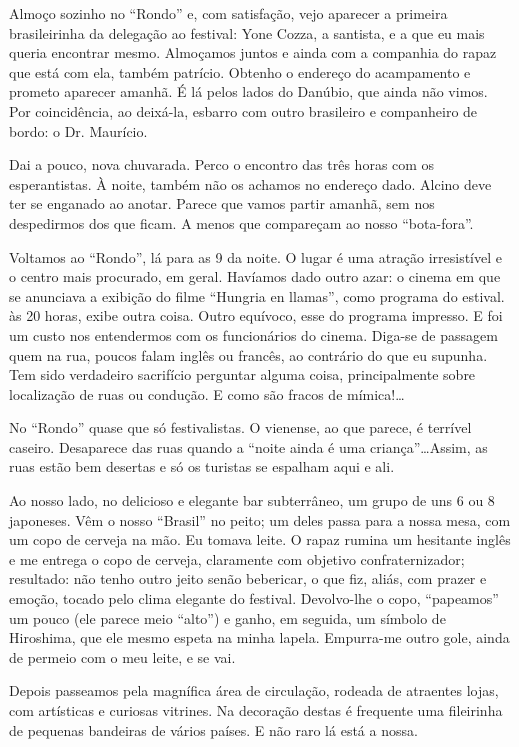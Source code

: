 Almoço sozinho no “Rondo” e, com satisfação, vejo aparecer a primeira brasileirinha da delegação ao festival: Yone Cozza, a santista, e a que eu mais queria encontrar mesmo. Almoçamos juntos e ainda com a companhia do rapaz que está com ela, também patrício. Obtenho o endereço do acampamento e prometo aparecer amanhã. É lá pelos lados do Danúbio, que ainda não vimos. Por coincidência, ao deixá-la, esbarro com outro brasileiro e companheiro de bordo: o Dr. Maurício.

Dai a pouco, nova chuvarada. Perco o encontro das três horas com os esperantistas. À noite, também não os achamos no endereço dado. Alcino deve ter se enganado ao anotar. Parece que vamos partir amanhã, sem nos despedirmos dos que ficam. A menos que compareçam ao nosso “bota-fora”.

Voltamos ao “Rondo”, lá para as 9 da noite. O lugar é uma atração irresistível e o centro mais procurado, em geral. Havíamos dado outro azar: o cinema em que se anunciava a exibição do filme “Hungria en llamas”, como programa do estival. às 20 horas, exibe outra coisa. Outro equívoco, esse do programa impresso. E foi um custo nos entendermos com os funcionários do cinema. Diga-se de passagem quem na rua, poucos falam inglês ou francês, ao contrário do que eu supunha. Tem sido verdadeiro sacrifício perguntar alguma coisa, principalmente sobre localização de ruas ou condução. E como são fracos de mímica!\ldots

No “Rondo” quase que só festivalistas. O vienense, ao que parece, é terrível caseiro. Desaparece das ruas quando a “noite ainda é uma criança”\ldots Assim, as ruas estão bem desertas e só os turistas se espalham aqui e ali.

Ao nosso lado, no delicioso e elegante bar subterrâneo, um grupo de uns 6 ou 8 japoneses. Vêm o nosso “Brasil” no peito; um deles passa para a nossa mesa, com um copo de cerveja na mão. Eu tomava leite. O rapaz rumina um hesitante inglês e me entrega o copo de cerveja, claramente com objetivo confraternizador; resultado: não tenho outro jeito senão bebericar, o que fiz, aliás, com prazer e emoção, tocado pelo clima elegante do festival. Devolvo-lhe o copo, “papeamos” um pouco (ele parece meio “alto”) e ganho, em seguida, um símbolo de Hiroshima, que ele mesmo espeta na minha lapela. Empurra-me outro gole, ainda de permeio com o meu leite, e se vai.

Depois passeamos pela magnífica área de circulação, rodeada de atraentes lojas, com artísticas e curiosas vitrines. Na decoração destas é frequente uma fileirinha de pequenas bandeiras de vários países. E não raro lá está a nossa.

